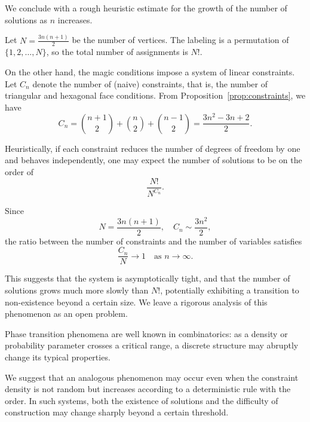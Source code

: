 \documentclass[11pt]{article}
\theoremstyle{plain}
\theoremstyle{definition}
\begin{document}
We conclude with a rough heuristic estimate for the growth of the number of solutions as \(n\) increases.

Let \(N = \frac{3n(n+1)}{2}\) be the number of vertices. The labeling is a permutation of \(\{1,2,\dots,N\}\), so the total number of assignments is \(N!\).

On the other hand, the magic conditions impose a system of linear constraints. 
Let \(C_n\) denote the number of (naive) constraints, that is, the number of triangular and hexagonal face conditions. From Proposition~\ref{prop:constraints}, we have
\[
C_n = \binom{n+1}{2} + \binom{n}{2} + \binom{n-1}{2}
= \frac{3n^2 - 3n + 2}{2}.
\]

Heuristically, if each constraint reduces the number of degrees of freedom by one and behaves independently, one may expect the number of solutions to be on the order of
\[
\frac{N!}{N^{C_n}}.
\]

Since
\[
N = \frac{3n(n+1)}{2}, \quad
C_n \sim \frac{3n^2}{2},
\]
the ratio between the number of constraints and the number of variables satisfies
\[
\frac{C_n}{N} \to 1 \quad \text{as } n \to \infty.
\]

This suggests that the system is asymptotically tight, and that the number of solutions grows much more slowly than \(N!\), potentially exhibiting a transition to non-existence beyond a certain size. We leave a rigorous analysis of this phenomenon as an open problem.

Phase transition phenomena are well known in combinatorics:
as a density or probability parameter crosses a critical range, a
discrete structure may abruptly change its typical properties.
\cite{JansonLuczakRucinski2000,Friedgut1999,MolloyReed1995}

We suggest that an analogous phenomenon may occur even when the
constraint density is not random but increases according to a deterministic
rule with the order. In such systems, both the existence of solutions and
the difficulty of construction may change sharply beyond a certain
threshold.
\end{document}
